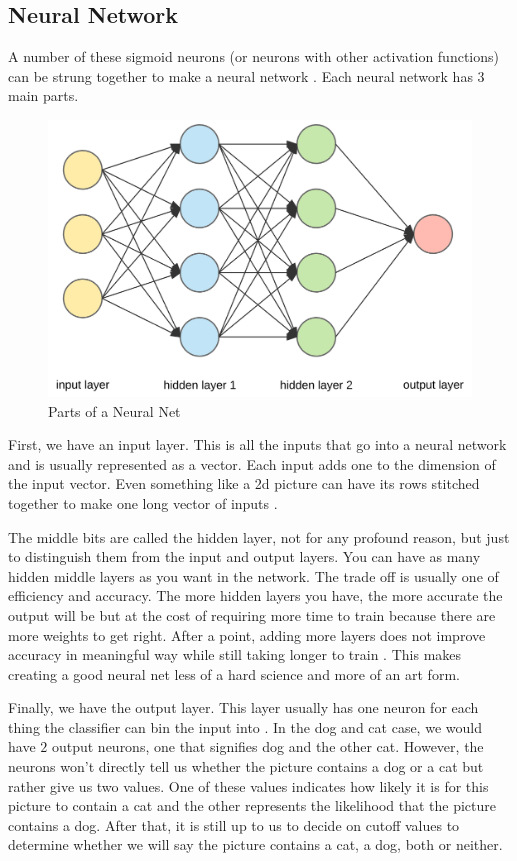 \subsection{Neural Network}

A number of these sigmoid neurons (or neurons with other activation functions) can be strung together to make a neural network \cite{Budinger_2014}.
Each neural network has 3 main parts.

\begin{figure}[H]
  \centering
  \includegraphics[width=120mm]{figures/neuralNet1.png}
  \caption{Parts of a Neural Net \cite{Lelli_2019}}
  \label{neuralNet2}
\end{figure}

First, we have an input layer.
This is all the inputs that go into a neural network and is usually represented as a vector.
Each input adds one to the dimension of the input vector.
Even something like a 2d picture can have its rows stitched together to make one long vector of inputs \cite{Bishop_2016}.

The middle bits are called the hidden layer, not for any profound reason, but just to distinguish them from the input and output layers.
You can have as many hidden middle layers as you want in the network.
The trade off is usually one of efficiency and accuracy.
The more hidden layers you have, the more accurate the output will be but at the cost of requiring more time to train because there are more weights to get right.
After a point, adding more layers does not improve accuracy in meaningful way while still taking longer to train \cite{Antoniadis_2024}.
This makes creating a good neural net less of a hard science and more of an art form.

Finally, we have the output layer.
This layer usually has one neuron for each thing the classifier can bin the input into \cite{Bishop_2016}.
In the dog and cat case, we would have $2$ output neurons, one that signifies dog and the other cat.
However, the neurons won't directly tell us whether the picture contains a dog or a cat but rather give us two values.
One of these values indicates how likely it is for this picture to contain a cat and the other represents the likelihood that the picture contains a dog.
After that, it is still up to us to decide on cutoff values to determine whether we will say the picture contains a cat, a dog, both or neither.
